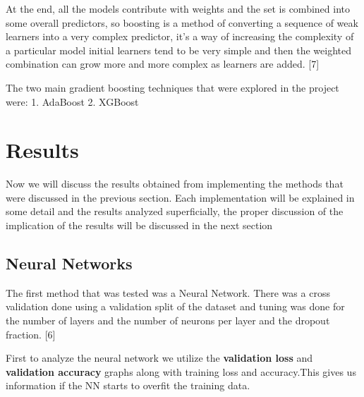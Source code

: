 \documentclass[11pt]{article}
\begin{document}
At the end, all the models contribute with weights and the set is
combined into some overall predictors, so boosting is a method of
converting a sequence of weak learners into a very complex predictor,
it's a way of increasing the complexity of a particular model initial
learners tend to be very simple and then the weighted combination can
grow more and more complex as learners are added. {[}7{]}

The two main gradient boosting techniques that were explored in the
project were: 1. AdaBoost 2. XGBoost

    \hypertarget{results}{%
\section{Results}\label{results}}

Now we will discuss the results obtained from implementing the methods
that were discussed in the previous section. Each implementation will be
explained in some detail and the results analyzed superficially, the
proper discussion of the implication of the results will be discussed in
the next section

    \hypertarget{neural-networks}{%
\subsection{Neural Networks}\label{neural-networks}}

The first method that was tested was a Neural Network. There was a cross
validation done using a validation split of the dataset and tuning was
done for the number of layers and the number of neurons per layer and
the dropout fraction. {[}6{]}

First to analyze the neural network we utilize the \textbf{validation
loss} and \textbf{validation accuracy} graphs along with training loss
and accuracy.This gives us information if the NN starts to overfit the
training data.
\end{document}
